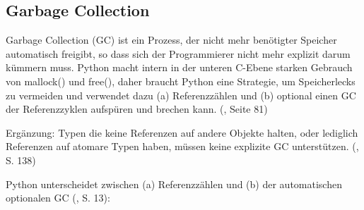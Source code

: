 \subsection{Garbage Collection}


Garbage Collection (GC) ist ein Prozess, der nicht mehr benötigter Speicher
automatisch freigibt, so dass sich der Programmierer nicht mehr explizit
darum kümmern muss. Python macht intern in der unteren C-Ebene starken
Gebrauch von mallock() und free(), daher braucht Python eine Strategie, um
Speicherlecks zu vermeiden und verwendet dazu (a) Referenzzählen und (b)
optional einen GC der Referenzzyklen aufspüren und brechen kann. (\cite{pyref-reference}, Seite 81)

Ergänzung: Typen die keine Referenzen auf andere Objekte halten, oder
lediglich Referenzen auf atomare Typen haben, müssen keine explizite GC
unterstützen. (\cite{pyref-c-api}, S. 138)

Python unterscheidet zwischen (a) Referenzzählen und (b) der automatischen
optionalen GC (\cite{pyref-extending}, S. 13):


